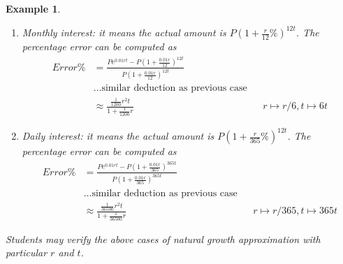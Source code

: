 \documentclass[12pt]{article}
\newtheorem*{example}{Example}
\begin{document}
\begin{example}
\begin{enumerate}
\begin{align*}
                Error\% &=\frac{Pe^{0.01rt}-P(1+\frac{0.01r}{6})^{6t}}{P(1+\frac{0.01r}{6})^{6t}}\\
                & \dots \textrm{similar deduction as previous case}\\
                &\approx \frac{\frac{1}{600}r^2 t}{1+\frac{1}{600}r}&&r\mapsto r/6, t\mapsto 6t
            \end{align*}
            \item Monthly interest: it means the actual amount is $P(1+\frac{r}{12}\%)^{12t}$. The percentage error can be computed as \begin{align*}
                Error\% &=\frac{Pe^{0.01rt}-P(1+\frac{0.01r}{12})^{12t}}{P(1+\frac{0.01r}{12})^{12t}}\\
                & \dots \textrm{similar deduction as previous case}\\
                &\approx \frac{\frac{1}{1200}r^2 t}{1+\frac{1}{1200}r}&&r\mapsto r/6, t\mapsto 6t
            \end{align*}
            \item Daily interest: it means the actual amount is $P(1+\frac{r}{365}\%)^{12t}$. The percentage error can be computed as \begin{align*}
                Error\% &=\frac{Pe^{0.01rt}-P(1+\frac{0.01r}{365})^{365t}}{P(1+\frac{0.01r}{365})^{365t}}\\
                & \dots \textrm{similar deduction as previous case}\\
                &\approx \frac{\frac{1}{36500}r^2 t}{1+\frac{1}{36500}r}&&r\mapsto r/365, t\mapsto 365t
            \end{align*}
        \end{enumerate}

        Students may verify the above cases of natural growth approximation with particular $r$ and $t$.
    \end{example}
\end{document}
